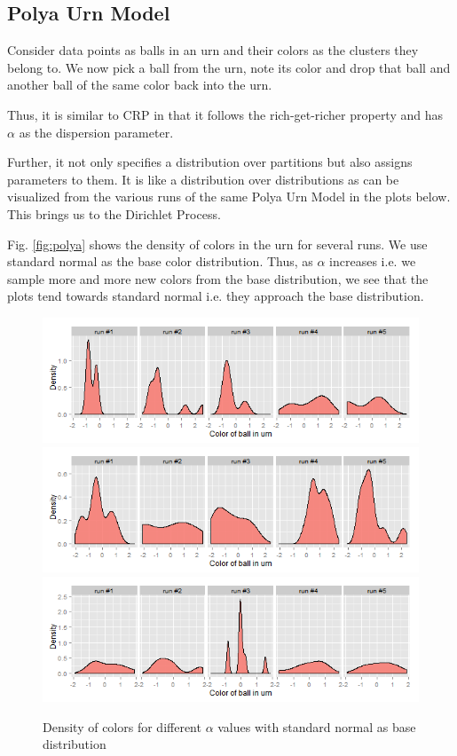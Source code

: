 \documentclass{article} %
\begin{document}
\subsection{Polya Urn Model}
Consider data points as balls in an urn and their colors as the clusters they belong to. We now pick a ball from the urn, note its color and drop that ball and another ball of the same color back into the urn.

Thus, it is similar to CRP in that it follows the rich-get-richer property and has $\alpha$ as the dispersion parameter.

Further, it not only specifies a distribution over partitions but also assigns parameters to them. It is like a distribution over distributions as can be visualized from the various runs of the same Polya Urn Model in the plots below. This brings us to the Dirichlet Process.

Fig. \ref{fig:polya} shows the density of colors in the urn for several runs. We use standard normal as the base color distribution. Thus, as $\alpha$ increases i.e. we sample more and more new colors from the base distribution, we see that the plots tend towards standard normal i.e. they approach the base distribution.
\begin{figure}
  \centering
  \caption{Density of colors for different $\alpha$ values with standard normal as base distribution}
\label{fig:polya}
  \includegraphics[width=.5\linewidth]{polya-urn-1.png}
  \label{fig:polya1}
  \includegraphics[width=.5\linewidth]{polya-urn-5.png}
  \label{fig:polya5}
  \includegraphics[width=.5\linewidth]{polya-urn-50.png}
  \label{fig:polya50}
\end{figure}
\end{document}
